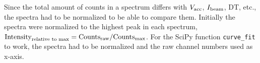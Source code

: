 





Since the total amount of counts in a spectrum differs with $V_\textnormal{acc}$, $I_\textnormal{beam}$, DT, etc., the spectra had to be normalized to be able to compare them.
Initially the spectra were normalized to the highest peak in each spectrum, $\textnormal{Intensity}_{\textnormal{relative to max}} = \textnormal{Counts}_{\textnormal{raw}} / \textnormal{Counts}_{\textnormal{max}}$.
For the SciPy function \verb|curve_fit| to work, the spectra had to be normalized and the raw channel numbers used as x-axis.


